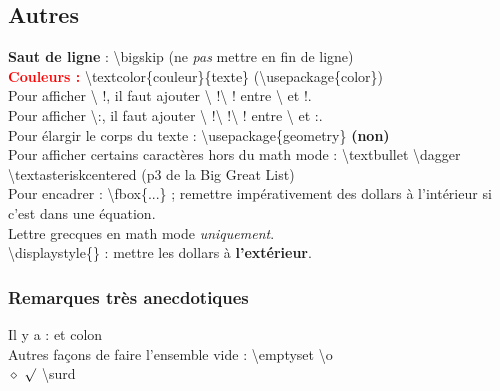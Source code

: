\documentclass{report}
\begin{document}

\subsection*{Autres}

\textbf{Saut de ligne} : {\selectfont \textbackslash{}bigskip} \quad (ne \textit{pas} mettre en fin de ligne) \\
\textbf{\textcolor{red}{Couleurs :}} {\selectfont \textbackslash{}textcolor\{couleur\}\{texte\}  (\textbackslash{}usepackage\{color\})}\\
Pour afficher {\selectfont \textbackslash{}\!\! !}, il faut ajouter {\selectfont \textbackslash{}\!\! !\textbackslash{}\!\! !} entre {\selectfont \textbackslash{}} et {\selectfont !}. \\
Pour afficher {\selectfont \textbackslash{}\!\!\!:}, il faut ajouter {\selectfont \textbackslash{}\!\! !\textbackslash{}\!\! !\textbackslash{}\!\! !} entre {\selectfont \textbackslash{}} et {\selectfont :}. \\
Pour élargir le corps du texte : {\selectfont \textbackslash{}usepackage\{geometry\}}  \textbf{(non)} \\
Pour afficher certains caractères hors du math mode : {\selectfont \textbackslash{}textbullet \textbackslash{}dagger \textbackslash{}textasteriskcentered (p3 de la Big Great List)} \\
Pour encadrer : {\selectfont \textbackslash{}fbox\{...\}} ; remettre impérativement des dollars à l'intérieur si c'est dans une équation. \\
Lettre grecques en math mode \textit{uniquement}.\\
{\selectfont \textbackslash{}displaystyle\{\} :} mettre les dollars à \textbf{l'extérieur}. 

\subsubsection*{Remarques très anecdotiques}

Il y a  {\selectfont :} et {\selectfont colon} \\
Autres façons de faire l'ensemble vide : {\selectfont \textbackslash{}emptyset \textbackslash{}o } \\
$ \diamond $  $ \surd $   {\selectfont \textbackslash{}surd}
\end{document}
